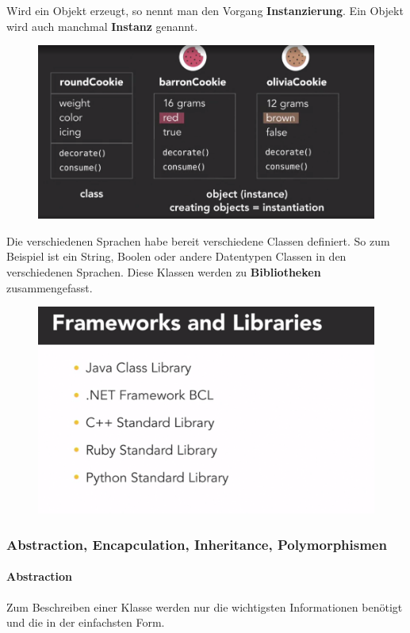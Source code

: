 Wird ein Objekt erzeugt, so nennt man den Vorgang \textbf{Instanzierung}. Ein Objekt wird auch manchmal \textbf{Instanz} genannt.
\begin{figure}[H]
	\centering
	\includegraphics[scale = 0.3]{attachment/chapter_2/Scc005}
	\caption{}
	\label{fig:Scc005}
\end{figure} Die verschiedenen Sprachen habe bereit verschiedene Classen definiert. So zum Beispiel ist ein String, Boolen oder andere Datentypen Classen in den verschiedenen Sprachen. Diese Klassen werden zu \textbf{Bibliotheken} zusammengefasst.
\begin{figure}[H]
	\centering
	\includegraphics[scale = 0.2]{attachment/chapter_2/Scc007}
	\caption{}
	\label{fig:Scc007}
\end{figure}
\subsubsection{Abstraction, Encapculation, Inheritance, Polymorphismen}
\paragraph{Abstraction} Zum Beschreiben einer Klasse werden nur die wichtigsten Informationen benötigt und die in der einfachsten Form.
